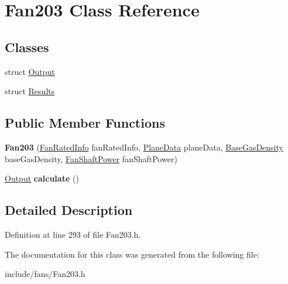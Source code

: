 \hypertarget{class_fan203}{}\section{Fan203 Class Reference}
\label{class_fan203}
\subsection*{Classes}
\begin{DoxyCompactItemize}
\item 
struct \hyperlink{struct_fan203_1_1_output}{Output}
\item 
struct \hyperlink{struct_fan203_1_1_results}{Results}
\end{DoxyCompactItemize}
\subsection*{Public Member Functions}
\begin{DoxyCompactItemize}
\item 
\mbox{\label{class_fan203_a1bfc0312472778af52324d9245a8b121}} 
{\bfseries Fan203} (\hyperlink{class_fan_rated_info}{Fan\+Rated\+Info} fan\+Rated\+Info, \hyperlink{class_plane_data}{Plane\+Data} plane\+Data, \hyperlink{class_base_gas_density}{Base\+Gas\+Density} base\+Gas\+Density, \hyperlink{class_fan_shaft_power}{Fan\+Shaft\+Power} fan\+Shaft\+Power)
\item 
\mbox{\label{class_fan203_a74256a8964735afeaf3800d52b92e551}} 
\hyperlink{struct_fan203_1_1_output}{Output} {\bfseries calculate} ()
\end{DoxyCompactItemize}


\subsection{Detailed Description}


Definition at line 293 of file Fan203.\+h.



The documentation for this class was generated from the following file\+:\begin{DoxyCompactItemize}
\item 
include/fans/Fan203.\+h\end{DoxyCompactItemize}

